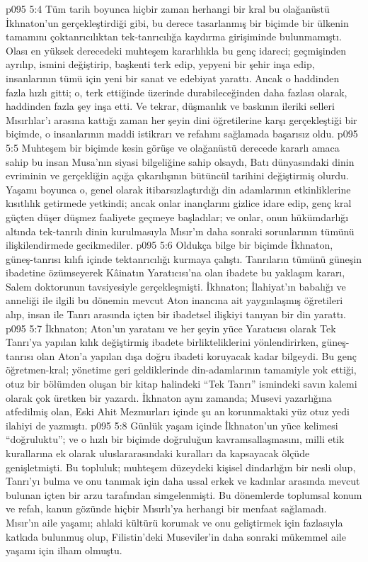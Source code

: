 \vs p095 5:4 Tüm tarih boyunca hiçbir zaman herhangi bir kral bu olağanüstü İkhnaton’un gerçekleştirdiği gibi, bu derece tasarlanmış bir biçimde bir ülkenin tamamını çoktanrıcılıktan tek\hyp{}tanrıcılığa kaydırma girişiminde bulunmamıştı. Olası en yüksek derecedeki muhteşem kararlılıkla bu genç idareci; geçmişinden ayrılıp, ismini değiştirip, başkenti terk edip, yepyeni bir şehir inşa edip, insanlarının tümü için yeni bir sanat ve edebiyat yarattı. Ancak o haddinden fazla hızlı gitti; o, terk ettiğinde üzerinde durabileceğinden daha fazlası olarak, haddinden fazla şey inşa etti. Ve tekrar, düşmanlık ve baskının ileriki selleri Mısırlılar’ı arasına kattığı zaman her şeyin dini öğretilerine karşı gerçekleştiği bir biçimde, o insanlarının maddi istikrarı ve refahını sağlamada başarısız oldu.
\vs p095 5:5 Muhteşem bir biçimde kesin görüşe ve olağanüstü derecede kararlı amaca sahip bu insan Musa’nın siyasi bilgeliğine sahip olsaydı, Batı dünyasındaki dinin evriminin ve gerçekliğin açığa çıkarılışının bütüncül tarihini değiştirmiş olurdu. Yaşamı boyunca o, genel olarak itibarsızlaştırdığı din adamlarının etkinliklerine kısıtlılık getirmede yetkindi; ancak onlar inançlarını gizlice idare edip, genç kral güçten düşer düşmez faaliyete geçmeye başladılar; ve onlar, onun hükümdarlığı altında tek\hyp{}tanrılı dinin kurulmasıyla Mısır’ın daha sonraki sorunlarının tümünü ilişkilendirmede gecikmediler.
\vs p095 5:6 Oldukça bilge bir biçimde İkhnaton, güneş\hyp{}tanrısı kılıfı içinde tektanrıcılığı kurmaya çalıştı. Tanrıların tümünü güneşin ibadetine özümseyerek Kâinatın Yaratıcısı’na olan ibadete bu yaklaşım kararı, Salem doktorunun tavsiyesiyle gerçekleşmişti. İkhnaton; İlahiyat’ın babalığı ve anneliği ile ilgili bu dönemin mevcut Aton inancına ait yaygınlaşmış öğretileri alıp, insan ile Tanrı arasında içten bir ibadetsel ilişkiyi tanıyan bir din yarattı.
\vs p095 5:7 İkhnaton; Aton’un yaratanı ve her şeyin yüce Yaratıcısı olarak Tek Tanrı’ya yapılan kılık değiştirmiş ibadete birlikteliklerini yönlendirirken, güneş\hyp{}tanrısı olan Aton’a yapılan dışa doğru ibadeti koruyacak kadar bilgeydi. Bu genç öğretmen\hyp{}kral; yönetime geri geldiklerinde din\hyp{}adamlarının tamamiyle yok ettiği, otuz bir bölümden oluşan bir kitap halindeki “Tek Tanrı” ismindeki savın kalemi olarak çok üretken bir yazardı. İkhnaton aynı zamanda; Musevi yazarlığına atfedilmiş olan, Eski Ahit Mezmurları içinde şu an korunmaktaki yüz otuz yedi ilahiyi de yazmıştı.
\vs p095 5:8 Günlük yaşam içinde İkhnaton’un yüce kelimesi “doğruluktu”; ve o hızlı bir biçimde doğruluğun kavramsallaşmasını, milli etik kurallarına ek olarak uluslararasındaki kuralları da kapsayacak ölçüde genişletmişti. Bu topluluk; muhteşem düzeydeki kişisel dindarlığın bir nesli olup, Tanrı’yı bulma ve onu tanımak için daha ussal erkek ve kadınlar arasında mevcut bulunan içten bir arzu tarafından simgelenmişti. Bu dönemlerde toplumsal konum ve refah, kanun gözünde hiçbir Mısırlı’ya herhangi bir menfaat sağlamadı. Mısır’ın aile yaşamı; ahlaki kültürü korumak ve onu geliştirmek için fazlasıyla katkıda bulunmuş olup, Filistin’deki Museviler’in daha sonraki mükemmel aile yaşamı için ilham olmuştu.
